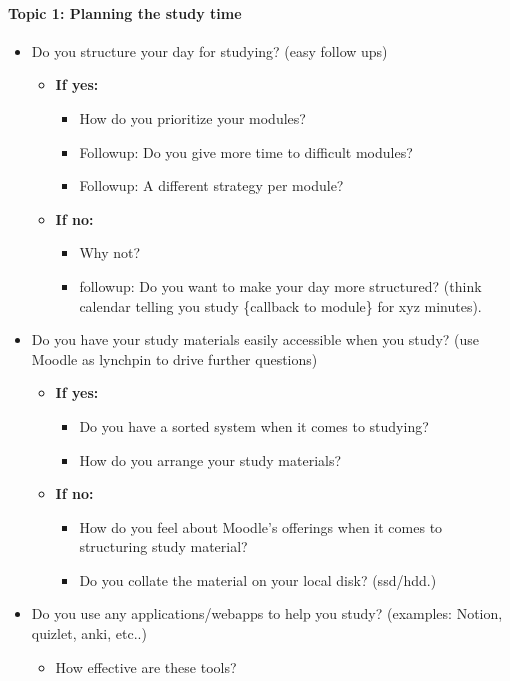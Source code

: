 \documentclass[a4paper,11pt]{article}
\begin{document}
\paragraph{Topic 1: Planning the study time}
\begin{itemize}
    \item Do you structure your day for studying? (easy follow ups)
    \begin{itemize}
        \item \textbf{If yes:}
        \begin{itemize}
            \item How do you prioritize your modules?
            \item Followup: Do you give more time to difficult modules? 
            \item Followup: A different strategy per module?
        \end{itemize}
        \item \textbf{If no:}
        \begin{itemize}
            \item Why not?
            \item followup: Do you want to make your day more structured? (think calendar telling you study \{callback to module\} for xyz minutes).
        \end{itemize}
    \end{itemize}
    \item Do you have your study materials easily accessible when you study? (use Moodle as lynchpin to drive further questions)
    \begin{itemize}
        \item \textbf{If yes:}
        \begin{itemize}
            \item Do you have a sorted system when it comes to studying?
            \item How do you arrange your study materials?
        \end{itemize}
        \item \textbf{If no:}
        \begin{itemize}
            \item How do you feel about Moodle's offerings when it comes to structuring study material?
            \item Do you collate the material on your local disk? (ssd/hdd.)
        \end{itemize}
    \end{itemize}
    \item Do you use any applications/webapps to help you study? (examples: Notion, quizlet, anki, etc..)
    \begin{itemize}
        \item How effective are these tools?
    \end{itemize}
\end{itemize}
\end{document}
